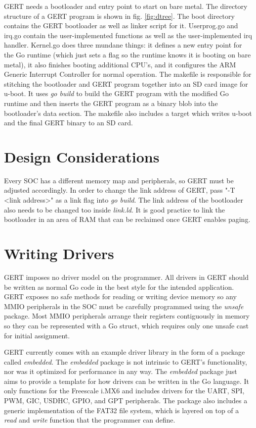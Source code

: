 GERT needs a bootloader
and entry point to start on bare metal. The directory structure of a GERT
program is shown in fig. \ref{fig:dtree}. The boot directory contains the GERT
bootloader as well as linker script for it. Userprog.go and irq.go contain
the user-implemented functions as well as the user-implemented irq handler.
Kernel.go does three mundane things: it defines a new entry point for the Go runtime
(which just sets a flag so the runtime knows it is booting on bare metal),
it also finishes booting additional CPU's, and it configures the ARM Generic Interrupt Controller \cite{gic} for normal operation. The makefile
is responsible for stitching the bootloader and GERT program together into an
SD card image for u-boot. It uses \textit{go build} to build the GERT program
with the modified Go runtime and then inserts the GERT program as a binary blob
into the bootloader's data section. The makefile also includes a target which writes
u-boot and the final GERT binary to an SD card.

\section{Design Considerations}
Every SOC has a different memory map and peripherals, so GERT must be adjusted
accordingly. In order to change the link address of GERT, pass "-T <link address>"
as a link flag into \textit{go build}. The link address of the bootloader also needs
to be changed too inside \textit{link.ld}. It is good practice to link the bootloader in an
area of RAM that can be reclaimed once GERT enables paging.

\section{Writing Drivers}
GERT imposes no driver model on the programmer. All drivers in
GERT should be written as normal Go code in the best style for
the intended application. GERT exposes no safe methods for reading
or writing device memory so any MMIO peripherals in the SOC must be
carefully programmed using the \textit{unsafe} package. Most MMIO
peripherals arrange their registers contiguously in memory so they
can be represented with a Go struct, which requires only one unsafe cast
for initial assignment.

GERT currently comes with an example driver
library in the form of a package called \textit{embedded}. The \textit{embedded} package is not intrinsic to GERT's
functionality, nor was it optimized for performance in any way. The \textit{embedded} package
just aims to provide a template for how drivers can be written in the Go language.
It only functions for the Freescale i.MX6 and includes drivers for the UART, SPI, PWM, GIC, USDHC, GPIO, and GPT peripherals.
The package also includes a generic implementation of the FAT32 file system, which is
layered on top of a \textit{read} and \textit{write} function that the programmer can define.


